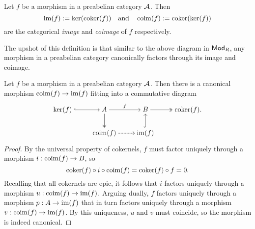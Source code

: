\begin{definition}
  Let $f$ be a morphism in a preabelian category $\mathcal{A}$.
  Then
  \[
    \operatorname{im}(f) := \ker(\operatorname{coker}(f))
    \quad \text{and} \quad
    \operatorname{coim}(f) := \operatorname{coker}(\ker(f))
  \]
  are the categorical \emph{image} and \emph{coimage} of $f$ respectively.
\end{definition}

The upshot of this definition is that similar to the above diagram in
${\mathsf{Mod}}_{{R}}$, any morphism in a preabelian category canonically factors
through its image and coimage.

\begin{lemma}
  \label{lemma_exists_canonical_coim_to_im}
  Let $f$ be a morphism in a preabelian category $\mathcal{A}$.
  Then there is a canonical morphism $\operatorname{coim}(f) \to \operatorname{im}(f)$ fitting
  into a commutative diagram
  \[
    \begin{tikzcd}[cramped]
      {\ker(f)} & A & B & {\coker(f)}. \\
      & {\coim(f)} & {\im(f)}
      \arrow[hook, from=1-1, to=1-2]
      \arrow["f", from=1-2, to=1-3]
      \arrow[two heads, from=1-2, to=2-2]
      \arrow[two heads, from=1-3, to=1-4]
      \arrow[dashed, from=2-2, to=2-3]
      \arrow[hook, from=2-3, to=1-3]
    \end{tikzcd}
  \]
  \vspace{-12pt}
\end{lemma}

\begin{proof}
  By the universal property of cokernels, $f$ must factor uniquely
  through a morphism $i: \operatorname{coim}(f) \to B$, so
  \[
    \operatorname{coker}(f) \circ i \circ \operatorname{coim}(f) = \operatorname{coker}(f) \circ f = 0.
  \]
  Recalling that all cokernels are epic, it follows that $i$ factors
  uniquely through a morphism $u: \operatorname{coim}(f) \to \operatorname{im}(f)$.
  Arguing dually, $f$ factors uniquely through a morphism $p: A \to
  \operatorname{im}(f)$ that in turn factors uniquely through a morphism $v:
  \operatorname{coim}(f) \to \operatorname{im}(f)$.
  By this uniqueness, $u$ and $v$ must coincide, so the morphism is
  indeed canonical.
\end{proof}

